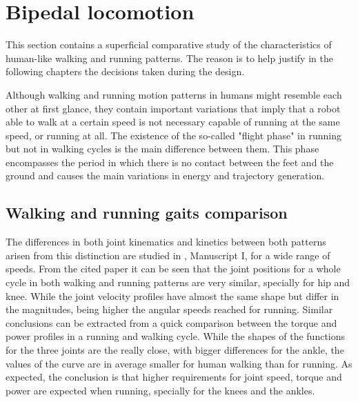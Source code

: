 
\section{Bipedal locomotion} %
\label{sec:bipedal_walking_and_running_gaits}
This section contains a superficial comparative study of the characteristics of human-like walking and running patterns.
The reason is to help justify in the following chapters the decisions taken during the design.

Although walking and running motion patterns in humans might resemble each other at first glance, they contain important variations that imply that a robot able to walk at a certain speed is not necessary capable of running at the same speed, or running at all.
The existence of the so-called "flight phase" in running but not in walking cycles is the main difference between them.
This phase encompasses the period in which there is no contact between the feet and the ground and causes the main variations in energy and trajectory generation.

\subsection{Walking and running gaits comparison} %
\label{sub:walk_and_run_comparison}
The differences in both joint kinematics and kinetics between both patterns arisen from this distinction are studied in \cite{grimmer}, Manuscript I, for a wide range of speeds.
From the cited paper it can be seen that the joint positions for a whole cycle in both walking and running patterns are very similar, specially for hip and knee.
While the joint velocity profiles have almost the same shape but differ in the magnitudes, being higher the angular speeds reached for running.
Similar conclusions can be extracted from a quick comparison between the torque and power profiles in a running and walking cycle.
While the shapes of the functions for the three joints are the really close, with bigger differences for the ankle, the values of the curve are in average smaller for human walking than for running.
As expected, the conclusion is that higher requirements for joint speed, torque and power are expected when running, specially for the knees and the ankles.




